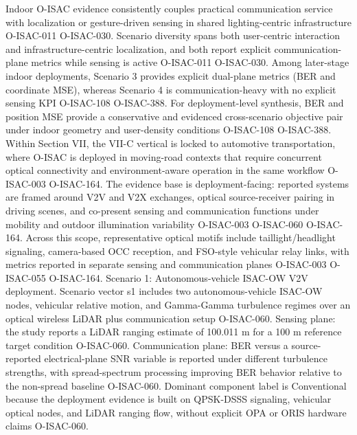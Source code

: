 {}\markdownRendererInterblockSeparator
{}\markdownRendererUlBeginTight
\markdownRendererUlItem Indoor O-ISAC evidence consistently couples practical communication service with localization or gesture-driven sensing in shared lighting-centric infrastructure O-ISAC-011 O-ISAC-030.\markdownRendererUlItemEnd 
\markdownRendererUlItem Scenario diversity spans both user-centric interaction and infrastructure-centric localization, and both report explicit communication-plane metrics while sensing is active O-ISAC-011 O-ISAC-030.\markdownRendererUlItemEnd 
\markdownRendererUlItem Among later-stage indoor deployments, Scenario 3 provides explicit dual-plane metrics (BER and coordinate MSE), whereas Scenario 4 is communication-heavy with no explicit sensing KPI O-ISAC-108 O-ISAC-388.\markdownRendererUlItemEnd 
\markdownRendererUlItem For deployment-level synthesis, BER and position MSE provide a conservative and evidenced cross-scenario objective pair under indoor geometry and user-density conditions O-ISAC-108 O-ISAC-388.\markdownRendererUlItemEnd 
\markdownRendererUlEndTight \markdownRendererInterblockSeparator
{}
\markdownRendererSectionEnd 
\markdownRendererSectionEnd \markdownRendererSectionBegin
{}\markdownRendererInterblockSeparator
{}\markdownRendererSectionBegin
{}\markdownRendererInterblockSeparator
{}Within Section VII, the VII-C vertical is locked to automotive transportation, where O-ISAC is deployed in moving-road contexts that require concurrent optical connectivity and environment-aware operation in the same workflow O-ISAC-003 O-ISAC-164. The evidence base is deployment-facing: reported systems are framed around V2V and V2X exchanges, optical source-receiver pairing in driving scenes, and co-present sensing and communication functions under mobility and outdoor illumination variability O-ISAC-003 O-ISAC-060 O-ISAC-164. Across this scope, representative optical motifs include taillight/headlight signaling, camera-based OCC reception, and FSO-style vehicular relay links, with metrics reported in separate sensing and communication planes O-ISAC-003 O-ISAC-055 O-ISAC-164.\markdownRendererInterblockSeparator
{}
\markdownRendererSectionEnd \markdownRendererSectionBegin
{}\markdownRendererInterblockSeparator
{}Scenario 1: Autonomous-vehicle ISAC-OW V2V deployment.\markdownRendererHardLineBreak
{}Scenario vector s1 includes two autonomous-vehicle ISAC-OW nodes, vehicular relative motion, and Gamma-Gamma turbulence regimes over an optical wireless LiDAR plus communication setup O-ISAC-060. Sensing plane: the study reports a LiDAR ranging estimate of 100.011 m for a 100 m reference target condition O-ISAC-060. Communication plane: BER versus a source-reported electrical-plane SNR variable is reported under different turbulence strengths, with spread-spectrum processing improving BER behavior relative to the non-spread baseline O-ISAC-060. Dominant component label is Conventional because the deployment evidence is built on QPSK-DSSS signaling, vehicular optical nodes, and LiDAR ranging flow, without explicit OPA or ORIS hardware claims O-ISAC-060.\markdownRendererParagraphSeparator
